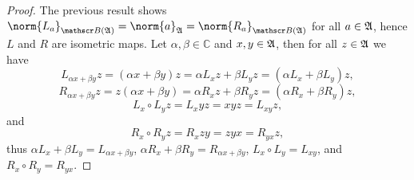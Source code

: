 \begin{proof}
    The previous result shows \(\norm{L_a}_{\bounded(\algebra{A})} = \norm{a}_{\algebra{A}} = \norm{R_a}_{\bounded(\algebra{A})}\) for all \(a \in \mathfrak{A}\), hence \(L\) and \(R\) are isometric maps. Let \(\alpha, \beta \in \mathbb{C}\) and \(x, y \in \mathfrak{A}\), then for all \(z \in \mathfrak{A}\) we have
    \begin{equation*}
        L_{\alpha x + \beta y}z = (\alpha x + \beta y)z = \alpha L_xz + \beta L_yz = \left(\alpha L_x + \beta L_y\right)z,
    \end{equation*}
    \begin{equation*}
        R_{\alpha x + \beta y}z = z(\alpha x + \beta y) = \alpha R_xz + \beta R_yz = \left(\alpha R_x + \beta R_y\right)z,
    \end{equation*}
    \begin{equation*}
        L_x \circ L_y z = L_xyz =xyz = L_{xy}z,
    \end{equation*}
    and
    \begin{equation*}
        R_x \circ R_y z = R_xzy = zyx = R_{yx}z,
    \end{equation*}
    thus \(\alpha L_x + \beta L_y = L_{\alpha x + \beta y}\), \(\alpha R_x + \beta R_y = R_{\alpha x + \beta y}\), \(L_x \circ L_y = L_{xy}\), and \(R_x \circ R_y = R_{yx}\).
\end{proof}
